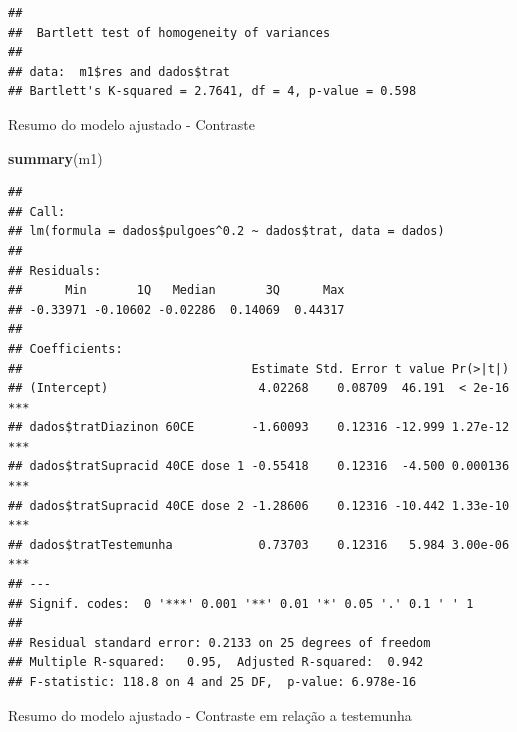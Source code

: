 \documentclass[
]{book}
\newenvironment{Shaded}{\begin{snugshade}}{\end{snugshade}}
\newcommand{\DataTypeTok}[1]{\textcolor[rgb]{0.13,0.29,0.53}{#1}}
\newcommand{\FloatTok}[1]{\textcolor[rgb]{0.00,0.00,0.81}{#1}}
\newcommand{\KeywordTok}[1]{\textcolor[rgb]{0.13,0.29,0.53}{\textbf{#1}}}
\newcommand{\NormalTok}[1]{#1}
\newcommand{\OperatorTok}[1]{\textcolor[rgb]{0.81,0.36,0.00}{\textbf{#1}}}
\newcommand{\StringTok}[1]{\textcolor[rgb]{0.31,0.60,0.02}{#1}}
\begin{document}
\begin{verbatim}
## 
##  Bartlett test of homogeneity of variances
## 
## data:  m1$res and dados$trat
## Bartlett's K-squared = 2.7641, df = 4, p-value = 0.598
\end{verbatim}

Resumo do modelo ajustado - Contraste

\begin{Shaded}
\begin{Highlighting}[]
\KeywordTok{summary}\NormalTok{(m1)}
\end{Highlighting}
\end{Shaded}

\begin{verbatim}
## 
## Call:
## lm(formula = dados$pulgoes^0.2 ~ dados$trat, data = dados)
## 
## Residuals:
##      Min       1Q   Median       3Q      Max 
## -0.33971 -0.10602 -0.02286  0.14069  0.44317 
## 
## Coefficients:
##                                Estimate Std. Error t value Pr(>|t|)    
## (Intercept)                     4.02268    0.08709  46.191  < 2e-16 ***
## dados$tratDiazinon 60CE        -1.60093    0.12316 -12.999 1.27e-12 ***
## dados$tratSupracid 40CE dose 1 -0.55418    0.12316  -4.500 0.000136 ***
## dados$tratSupracid 40CE dose 2 -1.28606    0.12316 -10.442 1.33e-10 ***
## dados$tratTestemunha            0.73703    0.12316   5.984 3.00e-06 ***
## ---
## Signif. codes:  0 '***' 0.001 '**' 0.01 '*' 0.05 '.' 0.1 ' ' 1
## 
## Residual standard error: 0.2133 on 25 degrees of freedom
## Multiple R-squared:   0.95,  Adjusted R-squared:  0.942 
## F-statistic: 118.8 on 4 and 25 DF,  p-value: 6.978e-16
\end{verbatim}

Resumo do modelo ajustado - Contraste em relação a testemunha

\begin{Shaded}
\end{Shaded}

\begin{Shaded}
\end{Shaded}
\end{document}
